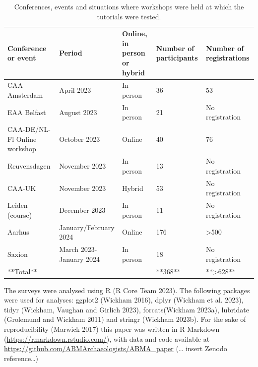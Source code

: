 \documentclass[
]{article}
\begin{document}
\begin{table}

\caption{\label{tab:events}Conferences, events and situations where workshops were held at which the tutorials were tested.}
\centering
\begin{tabular}[t]{l|l|l|l|l}
\hline
Conference or event & Period & Online, in person or hybrid & Number of participants & Number of registrations\\
\hline
CAA Amsterdam & April 2023 & In person & 36 & 53\\
\hline
EAA Belfast & August 2023 & In person & 21 & No registration\\
\hline
CAA-DE/NL-Fl Online workshop & October 2023 & Online & 40 & 76\\
\hline
Reuvensdagen & November 2023 & In person & 13 & No registration\\
\hline
CAA-UK & November 2023 & Hybrid & 53 & No registration\\
\hline
Leiden (course) & December 2023 & In person & 11 & No registration\\
\hline
Aarhus & January/February 2024 & Online & 176 & >500\\
\hline
Saxion & March 2023-January 2024 & In person & 18 & No registration\\
\hline
**Total** &  &  & **368** & **>628**\\
\hline
\end{tabular}
\end{table}

The surveys were analysed using R (R Core Team 2023). The following packages were used for analyses: ggplot2 (Wickham 2016), dplyr (Wickham et al. 2023), tidyr (Wickham, Vaughan and Girlich 2023), forcats(Wickham 2023a), lubridate (Grolemund and Wickham 2011) and stringr (Wickham 2023b). For the sake of reproducibility (Marwick 2017) this paper was written in R Markdown (\url{https://rmarkdown.rstudio.com/}), with data and code available at \url{https://github.com/ABMArchaeologists/ABMA_paper} (\ldots{} insert Zenodo reference\ldots)
\end{document}
